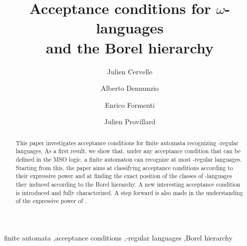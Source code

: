 \documentclass[preprint]{elsarticle}
\begin{document}
\begin{frontmatter}

\title{Acceptance conditions for \ensuremath{\omega}-languages\\ and the Borel hierarchy }



\author[Paris]{Julien Cervelle}

\author[Milano]{Alberto Dennunzio}

\author[Nice]{Enrico Formenti}

\author[Giessen]{Julien Provillard}


\address[Paris]{LACL UFR de Sciences et Technologie
Universit\'e Paris-Est Cr\'eteil Val-de-Marne,
61 avenue du G\'en\'eral de Gaulle,
94010 Cr\'eteil cedex,
France}

\address[Milano]{Universit\`a degli studi di Milano-Bicocca,
Dipartimento di Informatica Sistemistica e Comunicazione,  viale
Sarca 336, 20126 Milano (Italy)}
\address[Nice]{Universit\'e Nice-Sophia Antipolis,
Laboratoire I3S, 2000 Route des Colles, 06903 Sophia Antipolis
(France)}

\address[Giessen]{
Justus-Liebig Universit\"at Gie\ss en,
Institut f\"ur Informatik,
Arndtstra\ss e 2,
35392 Gie\ss en
}



\begin{abstract}
This paper investigates acceptance conditions for finite automata recognizing -regular languages.
As a first result, we show that, under any acceptance condition that can be defined in the MSO logic, a finite automaton can recognize at
most -regular languages. Starting from this, the paper aims at
classifying acceptance conditions according to their expressive power and at finding the exact position of the classes of -languages they induced according to the Borel hierarchy.
A new interesting acceptance condition is introduced and fully characterized. A step forward is also made in
the understanding of the expressive power of  .
\end{abstract}

\begin{keyword}
finite automata \sep acceptance conditions \sep -regular languages \sep Borel hierarchy
\end{keyword}

\end{frontmatter}
\end{document}
